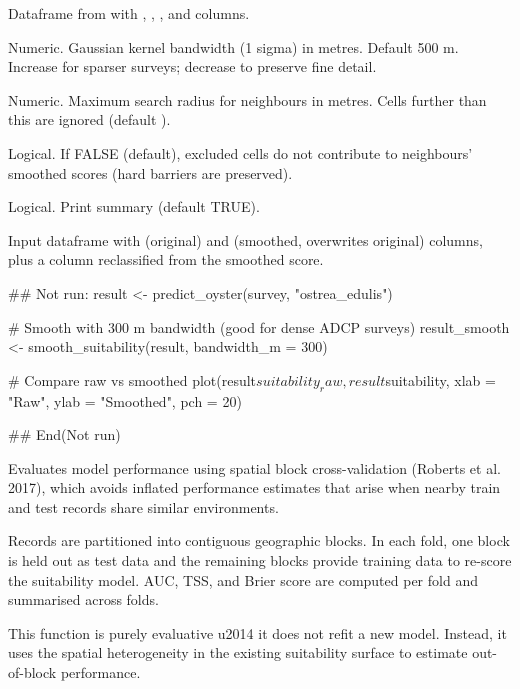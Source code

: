 \documentclass[a4paper]{book}
\begin{document}
\begin{Arguments}
\begin{ldescription}
\item[\code{result}] Dataframe from  with , ,
, and  columns.

\item[\code{bandwidth\_m}] Numeric. Gaussian kernel bandwidth (1 sigma) in metres.
Default 500 m. Increase for sparser surveys; decrease to preserve fine detail.

\item[\code{max\_radius\_m}] Numeric. Maximum search radius for neighbours in metres.
Cells further than this are ignored (default ).

\item[\code{smooth\_excluded}] Logical. If FALSE (default), excluded cells do not
contribute to neighbours' smoothed scores (hard barriers are preserved).

\item[\code{verbose}] Logical. Print summary (default TRUE).
\end{ldescription}
\end{Arguments}
%
\begin{Value}
Input dataframe with  (original) and
 (smoothed, overwrites original) columns, plus a
 column reclassified from the smoothed score.
\end{Value}
%
\begin{Examples}
\begin{ExampleCode}
## Not run: 
result <- predict_oyster(survey, "ostrea_edulis")

# Smooth with 300 m bandwidth (good for dense ADCP surveys)
result_smooth <- smooth_suitability(result, bandwidth_m = 300)

# Compare raw vs smoothed
plot(result$suitability_raw, result$suitability,
     xlab = "Raw", ylab = "Smoothed", pch = 20)

## End(Not run)
\end{ExampleCode}
\end{Examples}
%
\begin{Description}
Evaluates model performance using spatial block cross-validation (Roberts
et al. 2017), which avoids inflated performance estimates that arise when
nearby train and test records share similar environments.

Records are partitioned into  contiguous geographic blocks. In
each fold, one block is held out as test data and the remaining blocks
provide training data to re-score the suitability model. AUC, TSS, and
Brier score are computed per fold and summarised across folds.

This function is purely evaluative \bsl{}u2014 it does not refit a new model. Instead,
it uses the spatial heterogeneity in the existing  suitability
surface to estimate out-of-block performance.
\end{Description}
\end{document}
